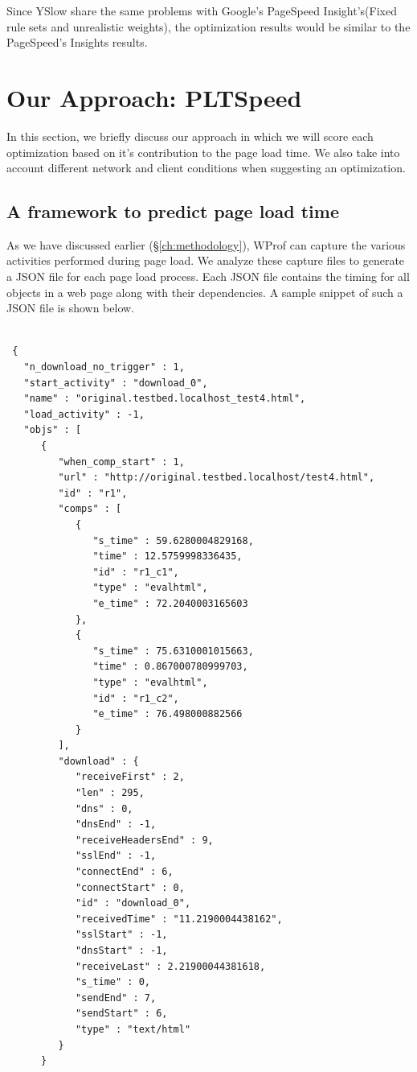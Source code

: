 \noindent Since YSlow share the same problems with Google's PageSpeed Insight's(Fixed rule sets and unrealistic weights), the optimization results would be similar to the PageSpeed's Insights results.

\section{Our Approach: PLTSpeed}
\noindent In this section, we briefly discuss our approach in which we will score each optimization based on it's contribution to the page load time. We also take into account different network and client conditions when suggesting an optimization.

\subsection{A framework to predict page load time}
 As we have discussed earlier (\S\ref{ch:methodology}), WProf can capture the various activities performed during page load. We analyze these capture files to generate a JSON file for each page load process. Each JSON file contains the timing for all objects in a web page along with their dependencies. A sample snippet of such a JSON file is shown below.
 

 
 \begin{verbatim}

 {
   "n_download_no_trigger" : 1,
   "start_activity" : "download_0",
   "name" : "original.testbed.localhost_test4.html",
   "load_activity" : -1,
   "objs" : [
      {
         "when_comp_start" : 1,
         "url" : "http://original.testbed.localhost/test4.html",
         "id" : "r1",
         "comps" : [
            {
               "s_time" : 59.6280004829168,
               "time" : 12.5759998336435,
               "id" : "r1_c1",
               "type" : "evalhtml",
               "e_time" : 72.2040003165603
            },
            {
               "s_time" : 75.6310001015663,
               "time" : 0.867000780999703,
               "type" : "evalhtml",
               "id" : "r1_c2",
               "e_time" : 76.498000882566
            }
         ],
         "download" : {
            "receiveFirst" : 2,
            "len" : 295,
            "dns" : 0,
            "dnsEnd" : -1,
            "receiveHeadersEnd" : 9,
            "sslEnd" : -1,
            "connectEnd" : 6,
            "connectStart" : 0,
            "id" : "download_0",
            "receivedTime" : "11.2190004438162",
            "sslStart" : -1,
            "dnsStart" : -1,
            "receiveLast" : 2.21900044381618,
            "s_time" : 0,
            "sendEnd" : 7,
            "sendStart" : 6,
            "type" : "text/html"
         }
      }
 \end{verbatim}

